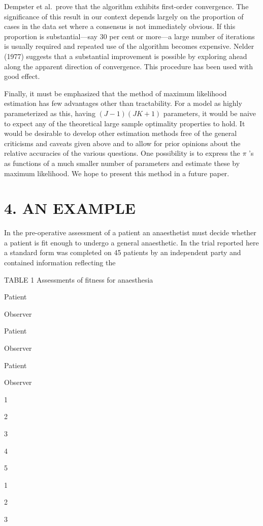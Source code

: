 \documentclass[
]{article}
\begin{document}
Dempster et al.~prove that the algorithm exhibits first-order
convergence. The significance of this result in our context depends
largely on the proportion of cases in the data set where a consensus is
not immediately obvious. If this proportion is substantial---say 30 per
cent or more---a large number of iterations is usually required and
repeated use of the algorithm becomes expensive. Nelder (1977) suggests
that a substantial improvement is possible by exploring ahead along the
apparent direction of convergence. This procedure has been used with
good effect.

Finally, it must be emphasized that the method of maximum likelihood
estimation has few advantages other than tractability. For a model as
highly parameterized as this, having \((J-1)(JK+1)\) parameters, it
would be naive to expect any of the theoretical large sample optimality
properties to hold. It would be desirable to develop other estimation
methods free of the general criticisms and caveats given above and to
allow for prior opinions about the relative accuracies of the various
questions. One possibility is to express the \(\pi\) 's as functions of
a much smaller number of parameters and estimate these by maximum
likelihood. We hope to present this method in a future paper.

\section{4. AN EXAMPLE}\label{an-example}

In the pre-operative assessment of a patient an anaesthetist must decide
whether a patient is fit enough to undergo a general anaesthetic. In the
trial reported here a standard form was completed on 45 patients by an
independent party and contained information reflecting the

TABLE 1 Assessments of fitness for anaesthesia

Patient

Observer

Patient

Observer

Patient

Observer

1

2

3

4

5

1

2

3
\end{document}

